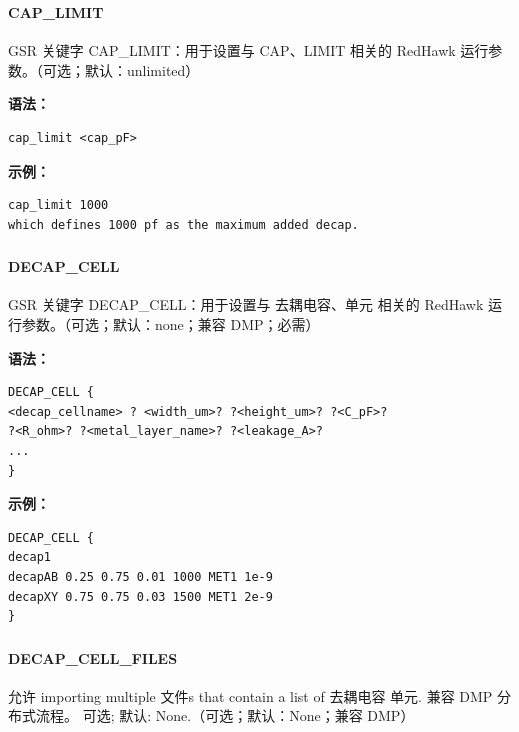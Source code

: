 \subsubsection{}
\paragraph*{CAP_LIMIT}

GSR 关键字 CAP_LIMIT：用于设置与 CAP、LIMIT 相关的 RedHawk 运行参数。（可选；默认：unlimited）

\textbf{语法：}
\begin{lstlisting}
cap_limit <cap_pF>
\end{lstlisting}

\textbf{示例：}
\begin{lstlisting}
cap_limit 1000
which defines 1000 pf as the maximum added decap.
\end{lstlisting}

\subsubsection{}
\paragraph*{DECAP_CELL}

GSR 关键字 DECAP_CELL：用于设置与 去耦电容、单元 相关的 RedHawk 运行参数。（可选；默认：none；兼容 DMP；必需）

\textbf{语法：}
\begin{lstlisting}
DECAP_CELL {
<decap_cellname> ? <width_um>? ?<height_um>? ?<C_pF>?
?<R_ohm>? ?<metal_layer_name>? ?<leakage_A>?
...
}
\end{lstlisting}

\textbf{示例：}
\begin{lstlisting}
DECAP_CELL {
decap1
decapAB 0.25 0.75 0.01 1000 MET1 1e-9
decapXY 0.75 0.75 0.03 1500 MET1 2e-9
}
\end{lstlisting}

\subsubsection{}
\paragraph*{DECAP_CELL_FILES}

允许 importing multiple 文件s that contain a list of 去耦电容 单元. 兼容 DMP 分布式流程。 可选; 默认: None.（可选；默认：None；兼容 DMP）

